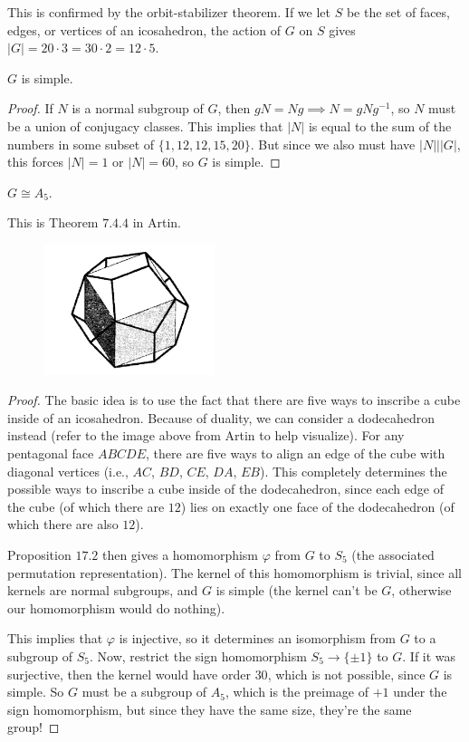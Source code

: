 This is confirmed by the orbit-stabilizer theorem. If we let $S$ be the set of faces, edges, or vertices of an icosahedron, the action of $G$ on $S$ gives $\vert G\vert = 20\cdot 3 = 30\cdot 2 = 12\cdot 5$.

\begin{theorem}
\thmlabel

$G$ is simple.
\end{theorem}
\begin{proof}
If $N$ is a normal subgroup of $G$, then $gN=Ng\implies N = gNg^{-1}$, so $N$ must be a union of conjugacy classes. This implies that $\vert N\vert$ is equal to the sum of the numbers in some subset of $\{1,12,12,15,20\}$. But since we also must have $\vert N\vert \mid \vert G\vert$, this forces $\vert N\vert = 1$ or $\vert N\vert = 60$, so $G$ is simple.
\end{proof}

\begin{theorem}
\thmlabel

$G\cong A_5$.
\end{theorem}

This is Theorem $7.4.4$ in Artin. 
\begin{figure}[h]
    \centering
    \includegraphics[width = 5cm]{images/inscribed_cube.png}
\end{figure}
\begin{proof}
The basic idea is to use the fact that there are five ways to inscribe a cube inside of an icosahedron. Because of duality, we can consider a dodecahedron instead (refer to the image above from Artin to help visualize). For any pentagonal face $ABCDE$, there are five ways to align an edge of the cube with diagonal vertices (i.e., $AC$, $BD$, $CE$, $DA$, $EB$). This completely determines the possible ways to inscribe a cube inside of the dodecahedron, since each edge of the cube (of which there are $12$) lies on exactly one face of the dodecahedron (of which there are also $12$).

Proposition $17.2$ then gives a homomorphism $\varphi$ from $G$ to $S_5$ (the associated permutation representation). The kernel of this homomorphism is trivial, since all kernels are normal subgroups, and $G$ is simple (the kernel can't be $G$, otherwise our homomorphism would do nothing).

This implies that $\varphi$ is injective, so it determines an isomorphism from $G$ to a subgroup of $S_5$. Now, restrict the sign homomorphism $S_5\rightarrow \{\pm 1\}$ to $G$. If it was surjective, then the kernel would have order $30$, which is not possible, since $G$ is simple. So $G$ must be a subgroup of $A_5$, which is the preimage of $+1$ under the sign homomorphism, but since they have the same size, they're the same group!
\end{proof}

